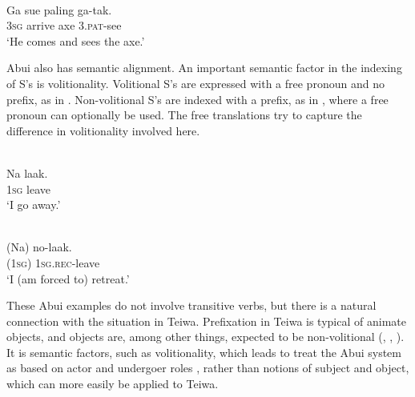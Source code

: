 \ea%
\label{bkm:Ref383697282}
 \\
\gll    Ga  sue  paling  ga-tak. \\  
      3\textsc{sg} arrive  axe  3.\textsc{pat}{}-see  \\
\glt  `He comes and sees the axe.'
\z

 





Abui also has semantic alignment. An important semantic factor in the indexing of S's is volitionality. Volitional S's are expressed with a free pronoun and no prefix, as in . Non-volitional S's are indexed with a prefix, as in , where a free pronoun can optionally be used. The free translations try to capture the difference in volitionality involved here.


\ea%
\label{bkm:Ref306280914}
 \\
\gll     Na  laak.\\  
     1\textsc{sg} leave \\
\glt  `I go away.'
\z








\ea%
\label{bkm:Ref306280918}
 \\ 
\gll     (Na)  no-laak.\\  
     (1\textsc{sg})  1\textsc{sg.rec}{}-leave \\
\glt  `I (am forced to) retreat.'
\z







These Abui examples do not involve transitive verbs, but there is a natural connection with the situation in Teiwa. Prefixation in Teiwa is typical of animate objects, and objects are, among other things, expected to be non-volitional (\citealt[90]{Givon1985}, \citealt[79]{Malchukov2005}, \citealt[4]{VonHeusingerEtAl2011}). It is semantic factors, such as volitionality, which leads \citet[177-178, 257]{Kratochvil2007} to treat the Abui system as based on actor and undergoer roles \citep{FoleyEtAl1984}, rather than notions of subject and object, which can more easily be applied to Teiwa.

